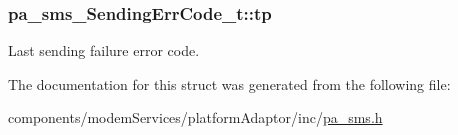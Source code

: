 \subsubsection[{\texorpdfstring{tp}{tp}}]{ pa\+\_\+sms\+\_\+\+Sending\+Err\+Code\+\_\+t\+::tp}\hypertarget{structpa__sms___sending_err_code__t_ad999ef4e02c8b0284aeedd055db114b8}{}\label{structpa__sms___sending_err_code__t_ad999ef4e02c8b0284aeedd055db114b8}


Last sending failure error code. 



The documentation for this struct was generated from the following file\+:\begin{DoxyCompactItemize}
\item 
components/modem\+Services/platform\+Adaptor/inc/\hyperlink{pa__sms_8h}{pa\+\_\+sms.\+h}\end{DoxyCompactItemize}

